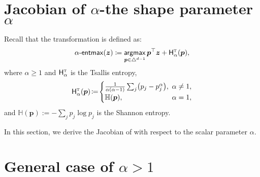 \def\RR{{\mathbb{R}}}
\def\EE{{\mathbb{E}}}
\def\RRY{\RR^{|\cY|}}
\def\y{\bm{y}}
\def\triangleY{\triangle^{|\cY|}}
\def\sizeY{{|\cY|}}
\def\cC{{\mathcal{C}}}
\def\cD{{\mathcal{D}}}
\def\cX{{\mathcal{X}}}
\def\cY{{\mathcal{Y}}}

\label{app:fenchelyoung}

\cleardoublepage
\doublespacing

\section*{Jacobian of {\boldmath $\alpha$}-\entmaxtext \wrt the shape parameter
      {\boldmath $\alpha$}}
\label{app:alpha_grad}

Recall that the \entmaxtext transformation is defined as:
\begin{equation}\label{eq:entmax_form_supp}
    \mathop{\mathsf{\alpha}\textnormal{-}\mathsf{entmax}}(\bm{z}) \coloneqq
    \operatorname*{\mathsf{argmax}}_{\bm{p} \in \triangle^{d-1}} \bm{p}^\top\bm{z} + \mathsf{H}^{{\textsc{t}}}_{\alpha}(\bm{p}),
\end{equation}
where $\alpha \geq 1$ and $\mathsf{H}^{{\textsc{t}}}_{\alpha}$ is the Tsallis entropy,
\begin{equation}%
    \HHt_{\alpha}(\bm{p})\!\coloneqq\!
    \begin{cases}
        \frac{1}{\alpha(\alpha-1)}\sum_j\!\left(p_j - p_j^\alpha\right)\!, &
        \!\!\!\alpha \ne 1,                                                  \\
        \mathbb H(\bm{p}),                                                 &
        \!\!\!\alpha = 1,
    \end{cases}
\end{equation}
and $\mathbb H(\bm{p}):= -\sum_j p_j \log p_j$ is the Shannon entropy.

In this section, we derive the Jacobian of \entmaxtext with respect to the scalar parameter $\alpha$.

\section*{General case of {\boldmath $\alpha>1$}}

